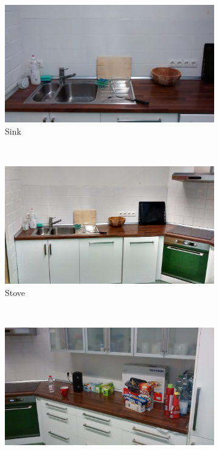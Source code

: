 \begin{figure}
    \centering
    \begin{subfigure}[b]{0.3\textwidth}
        \includegraphics[width=\textwidth]{images/sink.jpg}
        \caption{Sink}
        \label{fig:sink}
    \end{subfigure}
    ~ %
    \begin{subfigure}[b]{0.3\textwidth}
        \includegraphics[width=\textwidth]{images/stove.jpg}
        \caption{Stove}
        \label{fig:stove}
    \end{subfigure}
    ~ %
    \begin{subfigure}[b]{0.3\textwidth}
        \includegraphics[width=\textwidth]{images/counter-top.jpg}

\end{subfigure}
\end{figure}
